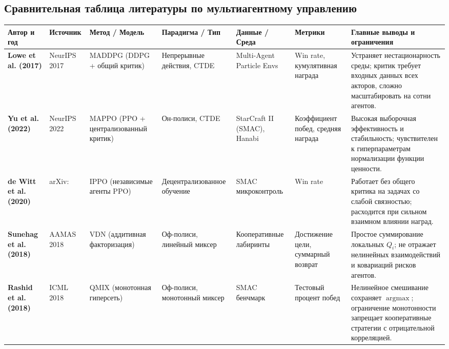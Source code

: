 \documentclass[11pt,a4paper]{article}
\begin{document}
\clearpage
\pdfpagewidth=297mm
\pdfpageheight=210mm
\subsection{Сравнительная таблица литературы по мультиагентному управлению}
{\fontsize{7.5pt}{8.8pt}\selectfont \renewcommand{\arraystretch}{0.96}
\noindent\begin{tabularx}{\linewidth}{>{\raggedright\arraybackslash}p{2.6cm} >{\raggedright\arraybackslash}p{2.1cm} >{\raggedright\arraybackslash}p{3.2cm} >{\raggedright\arraybackslash}p{2.4cm} >{\raggedright\arraybackslash}p{2.8cm} >{\raggedright\arraybackslash}p{2.2cm} >{\raggedright\arraybackslash}X}
\toprule
\textbf{Автор и год} & \textbf{Источник} & \textbf{Метод / Модель} & \textbf{Парадигма / Тип} & \textbf{Данные / Среда} & \textbf{Метрики} & \textbf{Главные выводы и ограничения} \\
\midrule
\textbf{Lowe et al. (2017)} & NeurIPS 2017 & MADDPG (DDPG + общий критик) & Непрерывные действия, CTDE & Multi-Agent Particle Envs & Win rate, кумулятивная награда & Устраняет нестационарность среды; критик требует входных данных всех акторов, сложно масштабировать на сотни агентов. \\
\midrule
\textbf{Yu et al. (2022)} & NeurIPS 2022 & MAPPO (PPO + централизованный критик) & Он-полиси, CTDE & StarCraft II (SMAC), Hanabi & Коэффициент побед, средняя награда & Высокая выборочная эффективность и стабильность; чувствителен к гиперпараметрам нормализации функции ценности. \\
\midrule
\textbf{de Witt et al. (2020)} & arXiv:\allowbreak 2011.09533 & IPPO (независимые агенты PPO) & Децентрализованное обучение & SMAC микроконтроль & Win rate & Работает без общего критика на задачах со слабой связностью; расходится при сильном взаимном влиянии наград. \\
\midrule
\textbf{Sunehag et al. (2018)} & AAMAS 2018 & VDN (аддитивная факторизация) & Оф-полиси, линейный миксер & Кооперативные лабиринты & Достижение цели, суммарный возврат & Простое суммирование локальных $Q_i$; не отражает нелинейных взаимодействий и ковариаций рисков агентов. \\
\midrule
\textbf{Rashid et al. (2018)} & ICML 2018 & QMIX (монотонная гиперсеть) & Оф-полиси, монотонный миксер & SMAC бенчмарк & Тестовый процент побед & Нелинейное смешивание сохраняет $\operatorname{argmax}$; ограничение монотонности запрещает кооперативные стратегии с отрицательной корреляцией. \\

\end{tabularx}}
\end{document}

